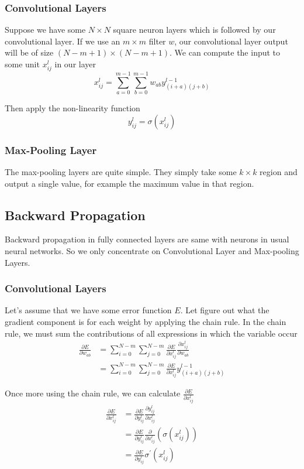 \documentclass[UTF8]{ctexart}
\begin{document}
\subsubsection{Convolutional Layers}
Suppose we have some $N \times N$ square neuron layers which is followed by our convolutional 
layer. If we use an $m \times m$ filter $w$, our convolutional layer output will be of size
$(N-m+1) \times (N-m+1)$. We can compute the input to some unit $x_{ij}^l$ in our layer
\[ x_{ij}^l = \sum_{a=0}^{m-1} \sum_{b=0}^{m-1} w_{ab}y_{(i+a)(j+b)}^{l-1} \]
\par
Then apply the non-linearity function
\[ y_{ij}^l = \sigma(x_{ij}^l) \]

\subsubsection{Max-Pooling Layer}
The max-pooling layers are quite simple. They simply take some $k \times k$ region and 
output a single value, for example the maximum value in that region.

\subsection{Backward Propagation}
Backward propagation in fully connected layers are same with neurons in usual neural networks.
So we only concentrate on Convolutional Layer and Max-pooling Layers.

\subsubsection{Convolutional Layers}
Let's assume that we have some error function $E$. Let figure out what the gradient component
is for each weight by applying the chain rule. In the chain rule, we must sum the contributions
of all expressions in which the variable occur
\begin{align}
\frac{\partial E}{\partial w_{ab}} 
&= \sum_{i=0}^{N-m} \sum_{j=0}^{N-m} \frac{\partial E}{\partial x_{ij}^l} \frac{\partial x_{ij}^l}{\partial w_{ab}}
\\
&= \sum_{i=0}^{N-m} \sum_{j=0}^{N-m} \frac{\partial E}{\partial x_{ij}^l} y_{(i+a)(j+b)}^{l-1}
\end{align}

\par
Once more using the chain rule, we can calculate $\frac{\partial E}{\partial x_{ij}^l}$
\begin{align}
\frac{\partial E}{\partial x_{ij}^l} 
&= \frac{\partial E}{\partial y_{ij}^l} \frac{\partial y_{ij}^l}{\partial x_{ij}^l}
\\
&= \frac{\partial E}{\partial y_{ij}^l} \frac{\partial}{\partial x_{ij}^l} (\sigma(x_{ij}^l))
\\
&= \frac{\partial E}{\partial y_{ij}^l} \sigma^{'}(x_{ij}^l)
\end{align}
\end{document}
